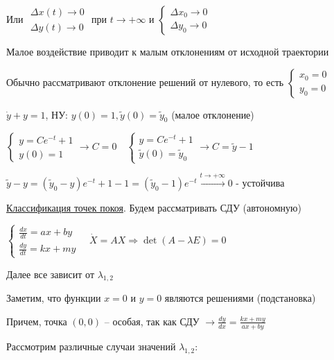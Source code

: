 \documentclass[12pt]{article}
\begin{document}
    Или $\begin{matrix}\Delta x (t) \to 0 \\ \Delta y (t) \to 0\end{matrix}$ при $t \to +\infty$ и $\begin{cases}\Delta x_0 \to 0 \\ \Delta y_0 \to 0\end{cases}$

    \Nota Малое воздействие приводит к малым отклонениям от исходной траектории

    \Nota Обычно рассматривают отклонение решений от нулевого, то есть $\begin{cases}x_0 = 0 \\ y_0 = 0\end{cases}$

    \Ex $\dot y + y = 1$, НУ: $y(0) = 1, \tilde{y}(0) = \tilde{y}_0$ (малое отклонение)

    $\begin{cases}y = Ce^{-t} + 1 \\ y(0) = 1\end{cases} \rightarrow C = 0 \quad
    \begin{cases}y = Ce^{-t} + 1 \\ \tilde{y}(0) = \tilde{y}_0\end{cases} \to C = \tilde{y} - 1$

    $\tilde{y} - y = (\tilde{y}_0 - y) e^{-t} + 1 - 1 = (\tilde{y}_0 - 1)e^{-t} \stackrel{t \to +\infty}{\longrightarrow} 0$ - устойчива{\Large 🥳}


    \underline{Классификация точек покоя}. Будем рассматривать СДУ (автономную)

    $\begin{cases}\frac{dx}{dt} = ax + by \\ \frac{dy}{dt} = kx + my\end{cases} \quad
    \dot X = AX \Longrightarrow \det(A - \lambda E) = 0$

    Далее все зависит от $\lambda_{1,2}$

    Заметим, что функции $x = 0$ и $y = 0$ являются решениями (подстановка)

    Причем, точка $(0, 0)$ -- особая, так как СДУ $\to \frac{dy}{dx} = \frac{kx + my}{ax + by}$

    Рассмотрим различные случаи значений $\lambda_{1,2}$:
\end{document}
